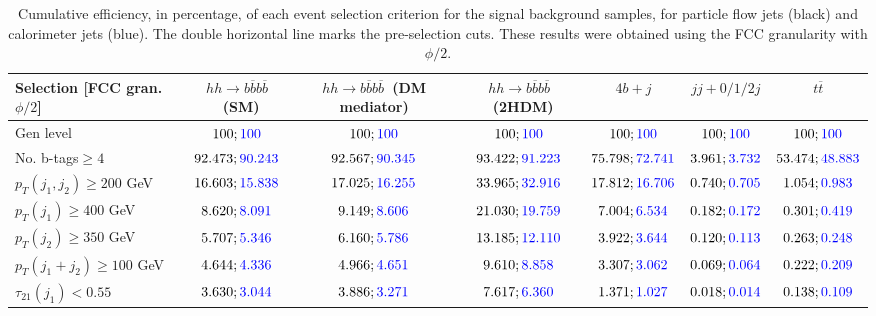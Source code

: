 \begin{landscape}
		\begin{table}
			\centering
			\caption{Cumulative efficiency, in percentage, of each event selection criterion for the signal background samples, for particle flow jets (black) and calorimeter jets (blue). The double horizontal line marks the pre-selection cuts. These results were obtained using the FCC granularity with $\phi/2$.}
			\begin{tabular}{lcccccc}
				\toprule 
				\textbf{Selection [FCC gran. $\phi/2$]} & $hh\rightarrow b\overline{b}b\overline{b}$~(SM) & $hh\rightarrow b\overline{b}b\overline{b}$~(DM mediator) & $hh\rightarrow b\overline{b}b\overline{b}$~(2HDM) & $4b+j$  & $jj+0/1/2 j$ & $t\overline{t}$ \\
				\midrule
				Gen level & $100;\textcolor{blue}{100}$ & $100;\textcolor{blue}{100}$ &$100;\textcolor{blue}{100}$& $100;\textcolor{blue}{100}$& $100;\textcolor{blue}{100}$& $100;\textcolor{blue}{100}$ \\
				\rowcolor{black!7}No. b-tags$\geq 4$&$92.473;\textcolor{blue}{90.243}$&$92.567;\textcolor{blue}{90.345}$&$93.422;\textcolor{blue}{91.223}$&$75.798;\textcolor{blue}{72.741}$&$3.961;\textcolor{blue}{3.732}$&$53.474;\textcolor{blue}{48.883}$\\
				$p_T(j_1,j_2)\geq200$ GeV & $16.603;\textcolor{blue}{15.838}$ & $17.025;\textcolor{blue}{16.255}$&$33.965;\textcolor{blue}{32.916}$ &$17.812;\textcolor{blue}{16.706}$&$0.740;\textcolor{blue}{0.705}$&$1.054;\textcolor{blue}{0.983}$\\
				\midrule \midrule
				\rowcolor{black!7}$p_T(j_1)\geq 400$ GeV & $8.620;\textcolor{blue}{8.091}$ &$9.149;\textcolor{blue}{8.606}$  &$21.030;\textcolor{blue}{19.759}$&$7.004;\textcolor{blue}{6.534}$&$0.182;\textcolor{blue}{0.172}$&$0.301;\textcolor{blue}{0.419}$\\ 
				$p_T(j_2)\geq 350$ GeV & $5.707;\textcolor{blue}{5.346}$& $6.160;\textcolor{blue}{5.786}$&$13.185;\textcolor{blue}{12.110}$&$3.922;\textcolor{blue}{3.644}$&$0.120;\textcolor{blue}{0.113}$&$0.263;\textcolor{blue}{0.248}$\\
				\rowcolor{black!7}$p_T(j_1+j_2)\geq 100$ GeV &$4.644;\textcolor{blue}{4.336}$ & $4.966;\textcolor{blue}{4.651}$ &$9.610;\textcolor{blue}{8.858}$&$3.307;\textcolor{blue}{3.062}$&$0.069;\textcolor{blue}{0.064}$&$0.222;\textcolor{blue}{0.209}$\\
				$\tau_{21}(j_1)<0.55$ & $3.630;\textcolor{blue}{3.044}$& $3.886;\textcolor{blue}{3.271}$&$7.617;\textcolor{blue}{6.360}$&$1.371;\textcolor{blue}{1.027}$&$0.018;\textcolor{blue}{0.014}$&$0.138;\textcolor{blue}{0.109}$\\

\end{tabular}
\end{table}
\end{landscape}
